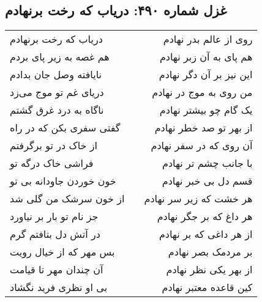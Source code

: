 \begin{center}
\section*{غزل شماره ۴۹۰: دریاب که رخت برنهادم}
\label{sec:490}
\begin{longtable}{l p{0.5cm} r}
دریاب که رخت برنهادم
&&
روی از عالم بدر نهادم
\\
هم غصه به زیر پای بردم
&&
هم پای به آن زبر نهادم
\\
نایافته وصل جان بدادم
&&
این نیز بر آن دگر نهادم
\\
دریای غم تو موج می‌زد
&&
من روی به موج در نهادم
\\
ناگاه به درد غرق گشتم
&&
یک گام چو بیشتر نهادم
\\
گفتی سفری بکن که در راه
&&
از بهر تو صد خطر نهادم
\\
از خاک در تو برگرفتم
&&
آن روی که در سفر نهادم
\\
فراشی خاک درگه تو
&&
با جانب چشم تر نهادم
\\
خون خوردن جاودانه بی تو
&&
قسم دل بی خبر نهادم
\\
از خون سرشک من گلی شد
&&
هر خشت که زیر سر نهادم
\\
جز نام تو بار بر نیاورد
&&
هر داغ که بر جگر نهادم
\\
در آتش دل بتافتم گرم
&&
از هر داغی که بر نهادم
\\
بس مهر که از خیال رویت
&&
بر مردمک بصر نهادم
\\
آن چندان مهر تا قیامت
&&
از بهر یکی نظر نهادم
\\
بی او نظری فرید نگشاد
&&
کین قاعده معتبر نهادم
\\
\end{longtable}
\end{center}
